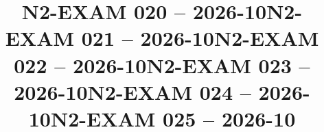 \documentclass{ip-exam}
\begin{document}







\cleartoeven
\setcounter{questioncounter}{0}
\setcounter{page}{1}
\title{N2-EXAM 020 -- 2026-10}
\makeexamheader








\cleartoeven
\setcounter{questioncounter}{0}
\setcounter{page}{1}
\title{N2-EXAM 021 -- 2026-10}
\makeexamheader








\cleartoeven
\setcounter{questioncounter}{0}
\setcounter{page}{1}
\title{N2-EXAM 022 -- 2026-10}
\makeexamheader








\cleartoeven
\setcounter{questioncounter}{0}
\setcounter{page}{1}
\title{N2-EXAM 023 -- 2026-10}
\makeexamheader








\cleartoeven
\setcounter{questioncounter}{0}
\setcounter{page}{1}
\title{N2-EXAM 024 -- 2026-10}
\makeexamheader








\cleartoeven
\setcounter{questioncounter}{0}
\setcounter{page}{1}
\title{N2-EXAM 025 -- 2026-10}
\makeexamheader
\end{document}
